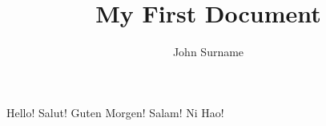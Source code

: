 \documentclass{article}
\author{John Surname}
\title{My First Document}
\begin{document}
\maketitle
\noindent \huge{Hello!}\newline
\large{Salut!}\newline
\normalsize{Guten Morgen!}\newline
\small{Salam!}\newline
\tiny{Ni Hao!}
\end{document}
